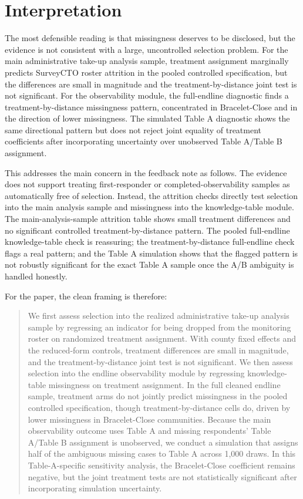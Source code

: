 \documentclass[11pt]{article}
\begin{document}
\clearpage

\section*{Interpretation}

The most defensible reading is that missingness deserves to be disclosed, but the evidence is not consistent with a large, uncontrolled selection problem. For the main administrative take-up analysis sample, treatment assignment marginally predicts SurveyCTO roster attrition in the pooled controlled specification, but the differences are small in magnitude and the treatment-by-distance joint test is not significant. For the observability module, the full-endline diagnostic finds a treatment-by-distance missingness pattern, concentrated in Bracelet-Close and in the direction of lower missingness. The simulated Table A diagnostic shows the same directional pattern but does not reject joint equality of treatment coefficients after incorporating uncertainty over unobserved Table A/Table B assignment.

This addresses the main concern in the feedback note as follows. The evidence does not support treating first-responder or completed-observability samples as automatically free of selection. Instead, the attrition checks directly test selection into the main analysis sample and missingness into the knowledge-table module. The main-analysis-sample attrition table shows small treatment differences and no significant controlled treatment-by-distance pattern. The pooled full-endline knowledge-table check is reassuring; the treatment-by-distance full-endline check flags a real pattern; and the Table A simulation shows that the flagged pattern is not robustly significant for the exact Table A sample once the A/B ambiguity is handled honestly.

For the paper, the clean framing is therefore:

\begin{quote}
We first assess selection into the realized administrative take-up analysis sample by regressing an indicator for being dropped from the monitoring roster on randomized treatment assignment. With county fixed effects and the reduced-form controls, treatment differences are small in magnitude, and the treatment-by-distance joint test is not significant. We then assess selection into the endline observability module by regressing knowledge-table missingness on treatment assignment. In the full cleaned endline sample, treatment arms do not jointly predict missingness in the pooled controlled specification, though treatment-by-distance cells do, driven by lower missingness in Bracelet-Close communities. Because the main observability outcome uses Table A and missing respondents' Table A/Table B assignment is unobserved, we conduct a simulation that assigns half of the ambiguous missing cases to Table A across 1,000 draws. In this Table-A-specific sensitivity analysis, the Bracelet-Close coefficient remains negative, but the joint treatment tests are not statistically significant after incorporating simulation uncertainty.
\end{quote}
\end{document}
